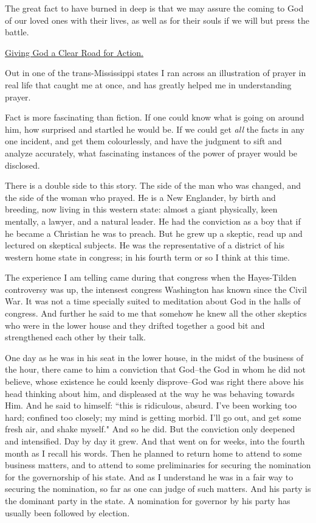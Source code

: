 The great fact to have burned in deep is that we may assure the coming to
God of our loved ones with their lives, as well as for their souls if we
will but press the battle.



\underline{Giving God a Clear Road for Action.}


Out in one of the trans-Mississippi states I ran across an illustration of
prayer in real life that caught me at once, and has greatly helped me in
understanding prayer.

Fact is more fascinating than fiction. If one could know what is going on
around him, how surprised and startled he would be. If we could get \textit{all}
the facts in any one incident, and get them colourlessly, and have the
judgment to sift and analyze accurately, what fascinating instances of the
power of prayer would be disclosed.

There is a double side to this story. The side of the man who was changed,
and the side of the woman who prayed. He is a New Englander, by birth and
breeding, now living in this western state: almost a giant physically,
keen mentally, a lawyer, and a natural leader. He had the conviction as a
boy that if he became a Christian he was to preach. But he grew up a
skeptic, read up and lectured on skeptical subjects. He was the
representative of a district of his western home state in congress; in his
fourth term or so I think at this time.

The experience I am telling came during that congress when the
Hayes-Tilden controversy was up, the intensest congress Washington has
known since the Civil War. It was not a time specially suited to
meditation about God in the halls of congress. And further he said to me
that somehow he knew all the other skeptics who were in the lower house
and they drifted together a good bit and strengthened each other by their
talk.

One day as he was in his seat in the lower house, in the midst of the
business of the hour, there came to him a conviction that God--the God in
whom he did not believe, whose existence he could keenly disprove--God was
right there above his head thinking about him, and displeased at the way
he was behaving towards Him. And he said to himself: ``this is ridiculous,
absurd. I've been working too hard; confined too closely; my mind is
getting morbid. I'll go out, and get some fresh air, and shake myself."
And so he did. But the conviction only deepened and intensified. Day by
day it grew. And that went on for weeks, into the fourth month as I recall
his words. Then he planned to return home to attend to some business
matters, and to attend to some preliminaries for securing the nomination
for the governorship of his state. And as I understand he was in a fair
way to securing the nomination, so far as one can judge of such matters.
And his party is the dominant party in the state. A nomination for
governor by his party has usually been followed by election.

